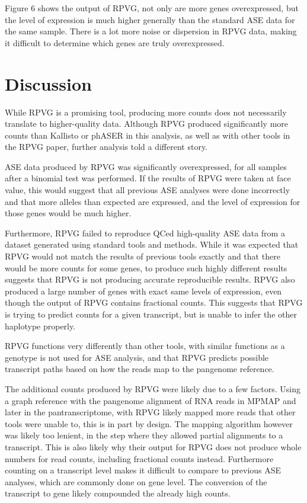 \documentclass{article}
\begin{document}
Figure 6 shows the output of RPVG, not only are more genes overexpressed, but the level of expression
is much higher generally than the standard ASE data for the same sample. There is a lot more noise
or dispersion in RPVG data, making it difficult to determine which genes are truly overexpressed.

\section{Discussion}

While RPVG is a promising tool, producing more counts does not necessarily 
translate to higher-quality data. Although RPVG produced significantly
more counts than Kallisto or phASER in this analysis, as well as with other tools in the 
RPVG paper, further analysis told a different story.

ASE data produced by RPVG was significantly overexpressed, for all samples
after a binomial test was performed. If the results of RPVG were taken at
face value, this would suggest that all previous ASE analyses were done
incorrectly and that more alleles than expected are expressed, and the level of expression
for those genes would be much higher. 

Furthermore, RPVG failed to reproduce QCed
high-quality ASE data from a dataset generated using standard tools and methods. While
it was expected that RPVG would not match the results of previous tools exactly 
and that there would be more counts for some genes, to produce such highly different results
suggests that RPVG is not producing accurate reproducible results. RPVG also produced a large
number of genes with exact same levels of expression, even though the output of RPVG contains fractional
counts. This suggests that RPVG is trying to predict counts for a given transcript, but 
is unable to infer the other haplotype properly.

RPVG functions very differently than other tools, with similar functions
as a genotype is not used for ASE analysis, and that RPVG predicts possible transcript 
paths based on how the reads map to the pangenome reference. 

The additional counts produced by RPVG were likely due to a few factors. Using a graph 
reference with the pangenome
alignment of RNA reads in MPMAP and later in the pantranscriptome, with RPVG likely mapped
more reads that other tools were unable to, this is in part by design. The mapping
algorithm however was likely too lenient, in the step where they allowed partial alignments to a 
transcript. This is also likely why their output for RPVG does not produce whole numbers for
read counts, including fractional counts instead. Furthermore counting on a transcript level
makes it difficult to compare to previous ASE analyses, which are commonly done on gene level. The 
conversion of the transcript to gene likely compounded the already high counts. 
\end{document}

